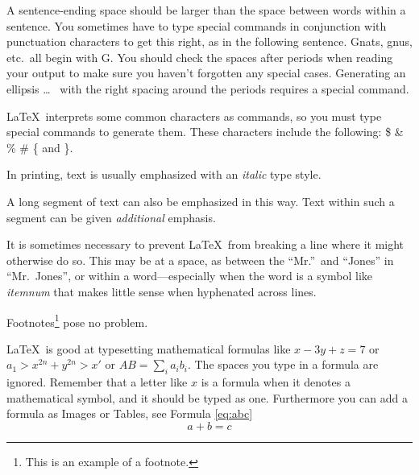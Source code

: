 \documentclass{article}      %
\begin{document}
A sentence-ending space should be larger than the
space between words within a sentence.  You
sometimes have to type special commands in
conjunction with punctuation characters to get
this right, as in the following sentence.
       Gnats, gnus, etc.\ all  %
       begin with G\@.         %
You should check the spaces after periods when
reading your output to make sure you haven't
forgotten any special cases.  Generating an
ellipsis
       \ldots\               %
with the right spacing around the periods requires
a special command.

\LaTeX\ interprets some common characters as
commands, so you must type special commands to
generate them.  These characters include the
following:
       \$ \& \% \# \{ and \}.

In printing, text is usually emphasized with an
       \emph{italic}  
type style.  

\begin{em}
   A long segment of text can also be emphasized 
   in this way.  Text within such a segment can be 
   given \emph{additional} emphasis.
\end{em}

It is sometimes necessary to prevent \LaTeX\ from
breaking a line where it might otherwise do so.
This may be at a space, as between the ``Mr.''\ and
``Jones'' in
       ``Mr.~Jones'',        %
or within a word---especially when the word is a
symbol like
       \mbox{\emph{itemnum}} 
that makes little sense when hyphenated across
lines.

Footnotes\footnote{This is an example of a footnote.}
pose no problem.

\LaTeX\ is good at typesetting mathematical formulas
like
       \( x-3y + z = 7 \) 
or
       \( a_{1} > x^{2n} + y^{2n} > x' \)
or  
       \( AB  = \sum_{i} a_{i} b_{i} \).
The spaces you type in a formula are 
ignored.  Remember that a letter like
       $x$                   %
is a formula when it denotes a mathematical
symbol, and it should be typed as one.
Furthermore you can add a formula as Images or Tables, see Formula  \hyperref[eq:abc]{\ref{eq:abc}}
\begin{equation}
\label{eq:abc}
a+b=c
\end{equation}
\end{document}
